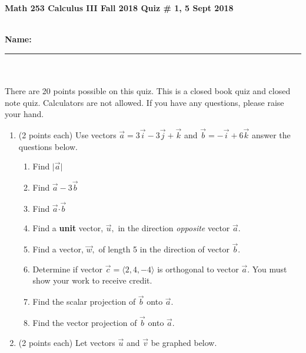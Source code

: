 \documentclass[11pt]{article}
\theoremstyle{remark}
\newcommand{\bcd}{\boldsymbol{\cdot}}
\begin{document}
{\bf Math 253 Calculus III Fall 2018 \hfill Quiz \# 1,  5 Sept 2018 }\\
\\
{\bf Name: \rule{3.5in}{1pt}}\\
\\
\noindent There are 20 points possible on this quiz. This is a closed
book quiz and closed note quiz. Calculators are not allowed. If you have any questions, please
raise your hand.

\begin{enumerate}
\item (2 points each) Use vectors $\vec{a}= 3 \vec{i} - 3 \vec{j} + \vec{k}$ and $\vec{b}= - \vec{i} +6 \vec{k}$ answer the questions below.
\begin{enumerate}
\item Find $\vert \vec{a} \vert$ \\
\vfill

\item Find $\vec{a} -3\vec{b}$ \\
\vfill

\item Find $\vec{a} \bcd \vec{b}$\\
\vfill

\item Find a \textbf{unit} vector, $\vec{u},$ in the direction \emph{opposite} vector $\vec{a}.$\\
\vfill

\item Find a vector, $\vec{w},$ of length 5 in the direction of vector $\vec{b}.$\\
\vfill

\item Determine if vector $\vec{c}= \langle 2,4,-4\rangle$ is orthogonal to vector $\vec{a}.$ You must show your work to receive credit.\\
\vfill

\item Find the scalar projection of $\vec{b}$ onto $\vec{a}.$\\
\vfill

\item Find the vector projection of $\vec{b}$ onto $\vec{a}.$\\
\vfill

\end{enumerate}
\newpage
\item (2 points each) Let vectors $\vec{u}$ and $\vec{v}$ be graphed below.\\
\begin{center}
\end{center}
\vspace{2in}


\end{enumerate}
\end{document}

